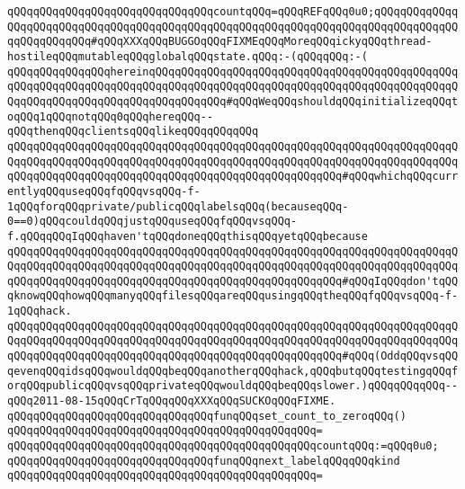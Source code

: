 \verb|qQQqqQQqqQQqqQQqqQQqqQQqqQQqqQQqcountqQQq=qQQqREFqQQq0u0;qQQqqQQqqQQqqQQqqQQqqQQqqQQqqQQqqQQqqQQqqQQqqQQqqQQqqQQqqQQqqQQqqQQqqQQqqQQqqQQqqQQqqQQqqQQqqQQq#qQQqXXXqQQqBUGGOqQQqFIXMEqQQqMoreqQQqickyqQQqthread-hostileqQQqmutableqQQqglobalqQQqstate.qQQq:-(qQQqqQQq:-(|\newline
\verb|qQQqqQQqqQQqqQQqhereinqQQqqQQqqQQqqQQqqQQqqQQqqQQqqQQqqQQqqQQqqQQqqQQqqQQqqQQqqQQqqQQqqQQqqQQqqQQqqQQqqQQqqQQqqQQqqQQqqQQqqQQqqQQqqQQqqQQqqQQqqQQqqQQqqQQqqQQqqQQqqQQqqQQqqQQq#qQQqWeqQQqshouldqQQqinitializeqQQqtoqQQq1qQQqnotqQQq0qQQqhereqQQq--qQQqthenqQQqclientsqQQqlikeqQQqqQQqqQQq|\newline
\verb|qQQqqQQqqQQqqQQqqQQqqQQqqQQqqQQqqQQqqQQqqQQqqQQqqQQqqQQqqQQqqQQqqQQqqQQqqQQqqQQqqQQqqQQqqQQqqQQqqQQqqQQqqQQqqQQqqQQqqQQqqQQqqQQqqQQqqQQqqQQqqQQqqQQqqQQqqQQqqQQqqQQqqQQqqQQqqQQqqQQqqQQqqQQqqQQq#qQQqwhichqQQqcurrentlyqQQquseqQQqfqQQqvsqQQq-f-1qQQqforqQQqprivate/publicqQQqlabelsqQQq(becauseqQQq-0==0)qQQqcouldqQQqjustqQQquseqQQqfqQQqvsqQQq-f.qQQqqQQqIqQQqhaven'tqQQqdoneqQQqthisqQQqyetqQQqbecause|\newline
\verb|qQQqqQQqqQQqqQQqqQQqqQQqqQQqqQQqqQQqqQQqqQQqqQQqqQQqqQQqqQQqqQQqqQQqqQQqqQQqqQQqqQQqqQQqqQQqqQQqqQQqqQQqqQQqqQQqqQQqqQQqqQQqqQQqqQQqqQQqqQQqqQQqqQQqqQQqqQQqqQQqqQQqqQQqqQQqqQQqqQQqqQQqqQQqqQQq#qQQqIqQQqdon'tqQQqknowqQQqhowqQQqmanyqQQqfilesqQQqareqQQqusingqQQqtheqQQqfqQQqvsqQQq-f-1qQQqhack.|\newline
\verb|qQQqqQQqqQQqqQQqqQQqqQQqqQQqqQQqqQQqqQQqqQQqqQQqqQQqqQQqqQQqqQQqqQQqqQQqqQQqqQQqqQQqqQQqqQQqqQQqqQQqqQQqqQQqqQQqqQQqqQQqqQQqqQQqqQQqqQQqqQQqqQQqqQQqqQQqqQQqqQQqqQQqqQQqqQQqqQQqqQQqqQQqqQQqqQQq#qQQq(OddqQQqvsqQQqevenqQQqidsqQQqwouldqQQqbeqQQqanotherqQQqhack,qQQqbutqQQqtestingqQQqforqQQqpublicqQQqvsqQQqprivateqQQqwouldqQQqbeqQQqslower.)qQQqqQQqqQQq--qQQq2011-08-15qQQqCrTqQQqqQQqXXXqQQqSUCKOqQQqFIXME.|\newline
\verb|qQQqqQQqqQQqqQQqqQQqqQQqqQQqqQQqfunqQQqset_count_to_zeroqQQq()|\newline
\verb|qQQqqQQqqQQqqQQqqQQqqQQqqQQqqQQqqQQqqQQqqQQqqQQq=|\newline
\verb|qQQqqQQqqQQqqQQqqQQqqQQqqQQqqQQqqQQqqQQqqQQqqQQqcountqQQq:=qQQq0u0;|\newline
\newline
\verb|qQQqqQQqqQQqqQQqqQQqqQQqqQQqqQQqfunqQQqnext_labelqQQqqQQqkind|\newline
\verb|qQQqqQQqqQQqqQQqqQQqqQQqqQQqqQQqqQQqqQQqqQQqqQQq=|\newline
